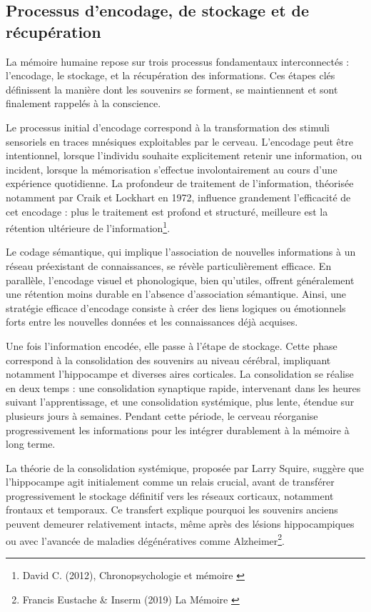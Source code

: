 \documentclass[11pt,a4paper]{report}
\begin{document}
\subsection{Processus d’encodage, de stockage et de récupération}
La mémoire humaine repose sur trois processus fondamentaux interconnectés : l'encodage, le stockage, et la récupération des informations. Ces étapes clés définissent la manière dont les souvenirs se forment, se maintiennent et sont finalement rappelés à la conscience.

Le processus initial d'encodage correspond à la transformation des stimuli sensoriels en traces mnésiques exploitables par le cerveau. L'encodage peut être intentionnel, lorsque l'individu souhaite explicitement retenir une information, ou incident, lorsque la mémorisation s'effectue involontairement au cours d'une expérience quotidienne. La profondeur de traitement de l'information, théorisée notamment par Craik et Lockhart en 1972, influence grandement l’efficacité de cet encodage : plus le traitement est profond et structuré, meilleure est la rétention ultérieure de l'information\footnote{David C. (2012), Chronopsychologie et mémoire \cite{clarys}}.

Le codage sémantique, qui implique l'association de nouvelles informations à un réseau préexistant de connaissances, se révèle particulièrement efficace. En parallèle, l'encodage visuel et phonologique, bien qu'utiles, offrent généralement une rétention moins durable en l'absence d'association sémantique. Ainsi, une stratégie efficace d'encodage consiste à créer des liens logiques ou émotionnels forts entre les nouvelles données et les connaissances déjà acquises.

Une fois l’information encodée, elle passe à l'étape de stockage. Cette phase correspond à la consolidation des souvenirs au niveau cérébral, impliquant notamment l'hippocampe et diverses aires corticales. La consolidation se réalise en deux temps : une consolidation synaptique rapide, intervenant dans les heures suivant l'apprentissage, et une consolidation systémique, plus lente, étendue sur plusieurs jours à semaines. Pendant cette période, le cerveau réorganise progressivement les informations pour les intégrer durablement à la mémoire à long terme.

La théorie de la consolidation systémique, proposée par Larry Squire, suggère que l'hippocampe agit initialement comme un relais crucial, avant de transférer progressivement le stockage définitif vers les réseaux corticaux, notamment frontaux et temporaux. Ce transfert explique pourquoi les souvenirs anciens peuvent demeurer relativement intacts, même après des lésions hippocampiques ou avec l’avancée de maladies dégénératives comme Alzheimer\footnote{Francis Eustache \& Inserm (2019) La Mémoire \cite{inserm}}.
\end{document}
